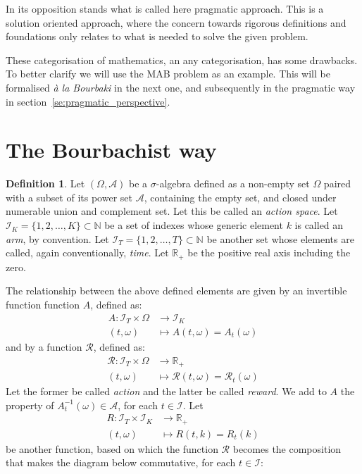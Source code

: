 \documentclass[]{scrartcl}
\theoremstyle{definition}
\newtheorem{definition}{Definition}[section]
\begin{document}
In its opposition stands what is called here pragmatic approach. This is a solution oriented approach, where the concern towards rigorous definitions and foundations only relates to what is needed to solve the given problem. 

These categorisation of mathematics, an any categorisation, has some drawbacks. To better clarify we will use the MAB problem as an example. This will be formalised \emph{à la Bourbaki} in the next one, and subsequently in the pragmatic way in section~\ref{se:pragmatic_perspective}.


\section{The Bourbachist way}
\label{se:bourbaki_perspective}

\begin{definition}
    Let $(\Omega, \mathcal{A})$ be a $\sigma$-algebra defined as a non-empty set $\Omega$ paired with a subset of its power set $\mathcal{A}$, containing the empty set, and closed under numerable union and complement set. Let this be called an \emph{action space}. Let $\mathcal{I}_{K} = \{1,2, \dots , K\} \subset \mathbb{N}$ be a set of indexes whose generic element $k$ is called an \emph{arm}, by convention. Let $\mathcal{I}_{T} = \{1,2, \dots , T\} \subset \mathbb{N}$ be another set whose elements are called, again conventionally, \emph{time}. Let $\mathbb{R}_{+}$ be the positive real axis including the zero.
\end{definition}

The relationship between the above defined elements are given by an invertible function function $A$, defined as:
\begin{align*}
    A : \mathcal{I}_T \times \Omega &\longrightarrow \mathcal{I}_K \\
        (t, \omega) &\longmapsto A(t, \omega) = A_t(\omega)
\end{align*}
and by a function $\mathcal{R}$, defined as:
\begin{align*}
\mathcal{R} : \mathcal{I}_T \times \Omega &\longrightarrow \mathbb{R}_{+} \\
(t, \omega) &\longmapsto \mathcal{R}(t, \omega) = \mathcal{R}_t(\omega)
\end{align*}
Let the former be called \emph{action} and the latter be called \emph{reward}. 
We add to $A$ the property of $A_t^{-1}(\omega) \in \mathcal{A}$, for each $t \in \mathcal{I}$.
Let
\begin{align*}
R : \mathcal{I}_T \times \mathcal{I}_K &\longrightarrow \mathbb{R}_{+} \\
(t, \omega) &\longmapsto R(t, k) = R_t(k)
\end{align*}
be another function, based on which the function $\mathcal{R}$ becomes the composition  that makes the diagram below commutative, for each $t \in \mathcal{I}$:
\end{document}
